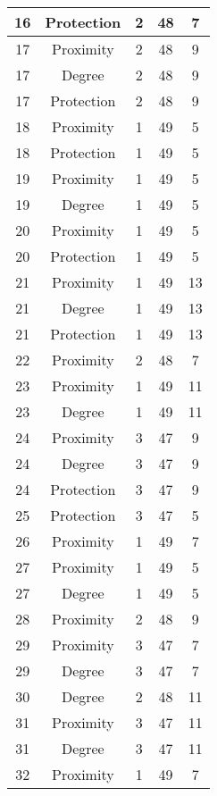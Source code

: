 \documentclass[results.tex]{subfiles}
\begin{document}
\begin{center}
\begin{tabular}{| c || c | c | c | c |}
    \hline
    16 & Protection & 2 & 48 & 7 \\ 
    \hline
    17 & Proximity & 2 & 48 & 9 \\ 
    \hline
    17 & Degree & 2 & 48 & 9 \\ 
    \hline
    17 & Protection & 2 & 48 & 9 \\ 
    \hline
    18 & Proximity & 1 & 49 & 5 \\ 
    \hline
    18 & Protection & 1 & 49 & 5 \\ 
    \hline
    19 & Proximity & 1 & 49 & 5 \\ 
    \hline
    19 & Degree & 1 & 49 & 5 \\ 
    \hline
    20 & Proximity & 1 & 49 & 5 \\ 
    \hline
    20 & Protection & 1 & 49 & 5 \\ 
    \hline
    21 & Proximity & 1 & 49 & 13 \\ 
    \hline
    21 & Degree & 1 & 49 & 13 \\ 
    \hline
    21 & Protection & 1 & 49 & 13 \\ 
    \hline
    22 & Proximity & 2 & 48 & 7 \\ 
    \hline
    23 & Proximity & 1 & 49 & 11 \\ 
    \hline
    23 & Degree & 1 & 49 & 11 \\ 
    \hline
    24 & Proximity & 3 & 47 & 9 \\ 
    \hline
    24 & Degree & 3 & 47 & 9 \\ 
    \hline
    24 & Protection & 3 & 47 & 9 \\ 
    \hline
    25 & Protection & 3 & 47 & 5 \\ 
    \hline
    26 & Proximity & 1 & 49 & 7 \\ 
    \hline
    27 & Proximity & 1 & 49 & 5 \\ 
    \hline
    27 & Degree & 1 & 49 & 5 \\ 
    \hline
    28 & Proximity & 2 & 48 & 9 \\ 
    \hline
    29 & Proximity & 3 & 47 & 7 \\ 
    \hline
    29 & Degree & 3 & 47 & 7 \\ 
    \hline
    30 & Degree & 2 & 48 & 11 \\ 
    \hline
    31 & Proximity & 3 & 47 & 11 \\ 
    \hline
    31 & Degree & 3 & 47 & 11 \\ 
    \hline
    32 & Proximity & 1 & 49 & 7 \\ 
    \hline

\end{tabular}
\end{center}
\end{document}
